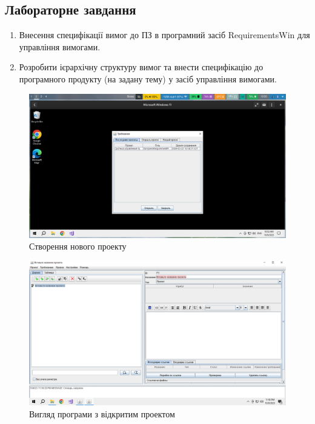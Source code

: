 \documentclass[14pt]{extreport}
\begin{document}
\begin{normalsize}
	\section*{Лабораторне завдання}
	\begin{enumerate}
		\item Внесення специфікації вимог до ПЗ в
		програмний засіб RequirementsWin для управління вимогами.
		\item Розробити ієрархічну структуру вимог та внести специфікацію
		до програмного продукту (на задану тему) у засіб управління вимогами.
	\end{enumerate}
	
	\begin{figure}[H]
		\centering
		\includegraphics[scale=0.35]{1}
		\caption{Створення нового проекту}
	\end{figure}


\begin{figure}[H]
	\centering
	\includegraphics[scale=0.35]{2}
	\caption{Вигляд програми з відкритим проектом}
\end{figure}


\end{normalsize}
\end{document}

